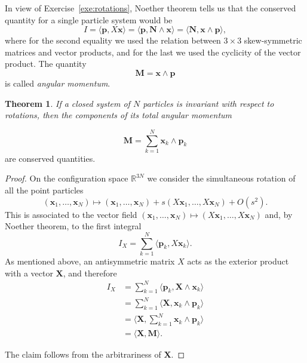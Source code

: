 \documentclass[english,fontsize=11pt,paper=a5,oneside]{scrbook}
\newcommand{\R}{\mathbb{R}}
\newcommand{\bx}{\bm{x}}
\newcommand{\bp}{\bm{p}}
\newcommand{\lag}{\langle}
\newcommand{\rag}{\rangle}
\newtheorem{theorem}{Theorem}[chapter]
\theoremstyle{definition}
\begin{document}
In view of Exercise~\ref{exe:rotations}, Noether theorem tells us that the conserved quantity for a single particle system would be
\begin{equation}
    I = \lag\bp, X\bx\rag = \lag\bp, \bm{N}\wedge \bx\rag = \lag\bm{N}, \bx\wedge \bp \rag,
\end{equation}
where for the second equality we used the relation between $3\times3$ skew-symmetric matrices and vector products, and for the last we used the cyclicity of the vector product.
The quantity
\begin{equation}
    \bm{M} = \bx \wedge \bp
\end{equation}
is called \emph{angular momentum}.

\begin{theorem}
If a closed system of $N$ particles is invariant with respect to rotations, then the components of its \emph{total angular momentum}
\end{theorem}
\begin{equation}
    \bm{M} = \sum_{k=1}^N \bx_k \wedge \bp_k
\end{equation}
are conserved quantities.
\begin{proof}
On the configuration space $\R^{3N}$ we consider the simultaneous rotation of all the point particles
\begin{equation}
(\bx_1,\ldots,\bx_N) \mapsto 
(\bx_1,\ldots,\bx_N) +
s (X\bx_1,\ldots,X\bx_N) + O(s^2).
\end{equation}
This is associated to the vector field $(\bx_1,\ldots,\bx_N) \mapsto (X\bx_1,\ldots,X\bx_N)$ and, by Noether theorem, to the first integral
\begin{equation}
    I_X = \sum_{k=1}^N \lag\bp_k, X\bx_k\rag.
\end{equation}
As mentioned above, an antisymmetric matrix $X$ acts as the exterior product with a vector $\bm{X}$, and therefore
\begin{align}
    I_X &= \sum_{k=1}^N \lag\bp_k, \bm{X}\wedge\bx_k\rag \\
    &= \sum_{k=1}^N \lag\bm{X}, \bx_k\wedge \bp_k\rag \\
    &= \lag\bm{X}, \sum_{k=1}^N \bx_k\wedge \bp_k\rag \\
    &= \lag\bm{X},\bm{M}\rag.
\end{align}

The claim follows from the arbitrariness of $\bm{X}$.
\end{proof}
\end{document}
